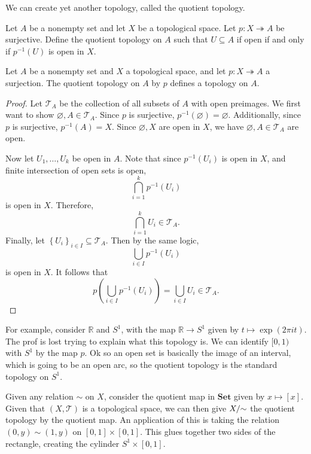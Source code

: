 We can create yet another topology, called the quotient topology.
\begin{definition}\label{dfn:2.9}
	Let $A$ be a nonempty set and let $X$ be a topological space. Let $p : X \twoheadrightarrow A$ be surjective. Define the quotient topology on $A$ such that $U\subseteq A$ if open if and only if $p ^{-1} (U)$ is open in $X$.
\end{definition}
\begin{proposition}\label{prp:2.9}
	Let $A$ be a nonempty set and $X$ a topological space, and let $p : X \twoheadrightarrow A$ a surjection. The quotient topology on $A$ by $p$ defines a topology on $A$.
\end{proposition}
\begin{proof}
	Let $\mathcal{T}_A$ be the collection of all subsets of $A$ with open preimages. We first want to show $\varnothing ,A\in \mathcal{T}_A$. Since $p$ is surjective, $p ^{-1} (\varnothing )=\varnothing $. Additionally, since $p$ is surjective, $p ^{-1} (A)=X$. Since $\varnothing ,X$ are open in $X$, we have $\varnothing ,A\in \mathcal{T}_A$ are open.

	Now let $U_1, \ldots , U_k$ be open in $A$. Note that since $p ^{-1} (U_i)$ is open in $X$, and finite intersection of open sets is open,
	\[
		\bigcap_{i=1}^k p ^{-1} (U_i)
	\]
	is open in $X$. Therefore,
	\[
		\bigcap_{i=1}^k U_i \in \mathcal{T}_A
	.\]
	Finally, let $\left\{U_i \right\}_{i\in I} \subseteq \mathcal{T}_A$. Then by the same logic,
	\[
		\bigcup_{i\in I} p ^{-1}(U_i)
	\]
	is open in $X$. It follows that
	\[
		p\left( \bigcup_{i\in I} p ^{-1} (U_i) \right) =\bigcup_{i\in I}U_i \in \mathcal{T}_A
	.\]
\end{proof}

For example, consider $\mathbb{R} $ and $S^1$, with the map $\mathbb{R} \to S^1$ given by $t\mapsto \exp (2\pi it)$. The prof is lost trying to explain what this topology is. We can identify $[0,1)$ with $S^1$ by the map $p$. Ok so an open set is basically the image of an interval, which is going to be an open arc, so the quotient topology is the standard topology on $S^1$.

Given any relation $\sim $ on $X$, consider the quotient map in $\mathbf{Set} $ given by $x\mapsto [x]$. Given that $(X,\mathcal{T} )$ is a topological space, we can then give $X /\mathbin{\sim} $ the quotient topology by the quotient map. An application of this is taking the relation $(0,y)\sim (1,y)$ on $[0,1]\times [0,1]$. This glues together two sides of the rectangle, creating the cylinder $S^1 \times [0,1]$.
